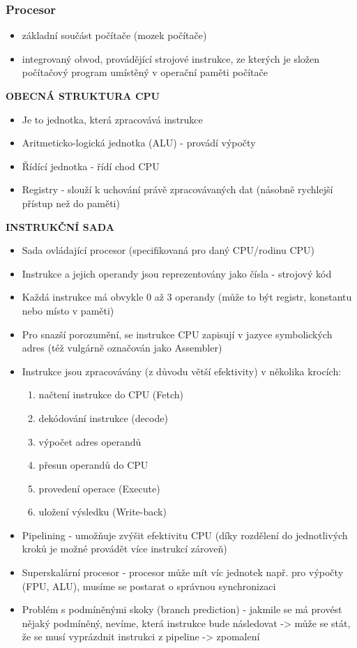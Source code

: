\documentclass[10pt,a4paper]{article}
\begin{document}
\subsubsection{Procesor}
\begin{itemize}
	\item základní součást počítače (mozek počítače)
	\item integrovaný obvod, provádějící strojové instrukce, ze kterých je složen počítačový program umístěný v operační paměti počítače
\end{itemize}

\textbf{OBECNÁ STRUKTURA CPU}
\begin{itemize}
	\item Je to jednotka, která zpracovává instrukce
	\item Aritmeticko-logická jednotka (ALU) - provádí výpočty
	\item Řídící jednotka - řídí chod CPU
	\item Registry - slouží k uchování právě zpracovávaných dat (násobně rychlejší přístup než do paměti)
\end{itemize}

\textbf{INSTRUKČNÍ SADA}
\begin{itemize}
	\item Sada ovládající procesor (specifikovaná pro daný CPU/rodinu CPU)
	\item Instrukce a jejich operandy jsou reprezentovány jako čísla - strojový kód
	\item Každá instrukce má obvykle 0 až 3 operandy (může to být registr, konstantu nebo místo v paměti)
	\item Pro snazší porozumění, se instrukce CPU zapisují v jazyce symbolických adres (též vulgárně označován jako Assembler)
	\item Instrukce jsou zpracovávány (z důvodu větší efektivity) v několika krocích:
	\begin{enumerate}
		\item načtení instrukce do CPU (Fetch)
		\item dekódování instrukce (decode)
		\item výpočet adres operandů
		\item přesun operandů do CPU
		\item provedení operace (Execute)
		\item uložení výsledku (Write-back)
	\end{enumerate}
	\item Pipelining - umožňuje zvýšit efektivitu CPU (díky rozdělení do jednotlivých kroků je možné provádět více instrukcí zároveň)
	\item Superskalární procesor - procesor může mít víc jednotek např. pro výpočty (FPU, ALU), musíme se postarat o správnou synchronizaci
	\item Problém s podmíněnými skoky (branch prediction) - jakmile se má provést nějaký podmíněný, nevíme, která instrukce bude následovat -> může se stát, že se musí vyprázdnit instrukci z pipeline -> zpomalení
\end{itemize}
\end{document}
